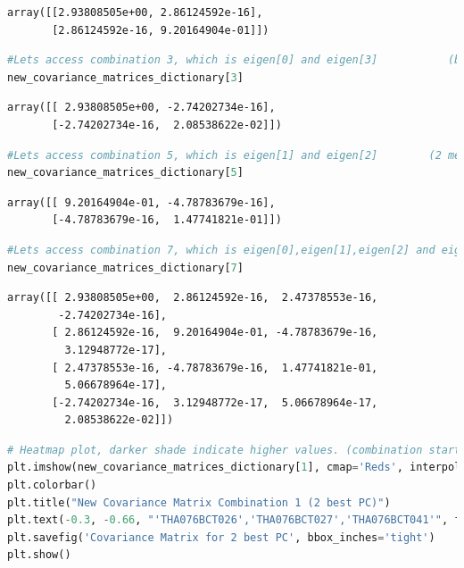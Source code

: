 \documentclass[
]{article}
\begin{document}
\begin{lstlisting}
array([[2.93808505e+00, 2.86124592e-16],
       [2.86124592e-16, 9.20164904e-01]])
\end{lstlisting}

\begin{lstlisting}[language=Python]
#Lets access combination 3, which is eigen[0] and eigen[3]           (best and worst component)
new_covariance_matrices_dictionary[3]
\end{lstlisting}

\begin{lstlisting}
array([[ 2.93808505e+00, -2.74202734e-16],
       [-2.74202734e-16,  2.08538622e-02]])
\end{lstlisting}

\begin{lstlisting}[language=Python]
#Lets access combination 5, which is eigen[1] and eigen[2]        (2 medium medium best components)
new_covariance_matrices_dictionary[5]
\end{lstlisting}

\begin{lstlisting}
array([[ 9.20164904e-01, -4.78783679e-16],
       [-4.78783679e-16,  1.47741821e-01]])
\end{lstlisting}

\begin{lstlisting}[language=Python]
#Lets access combination 7, which is eigen[0],eigen[1],eigen[2] and eigen[3]      (all components combined)
new_covariance_matrices_dictionary[7]
\end{lstlisting}

\begin{lstlisting}
array([[ 2.93808505e+00,  2.86124592e-16,  2.47378553e-16,
        -2.74202734e-16],
       [ 2.86124592e-16,  9.20164904e-01, -4.78783679e-16,
         3.12948772e-17],
       [ 2.47378553e-16, -4.78783679e-16,  1.47741821e-01,
         5.06678964e-17],
       [-2.74202734e-16,  3.12948772e-17,  5.06678964e-17,
         2.08538622e-02]])
\end{lstlisting}

\begin{lstlisting}[language=Python]
# Heatmap plot, darker shade indicate higher values. (combination starts from 0 to 7)
plt.imshow(new_covariance_matrices_dictionary[1], cmap='Reds', interpolation='nearest')  #for smoother interpolation of color on pixel values, instead of 'nearest', we can use 'bilinear','bicubic','spline16', 'spline36', 'hanning', 'hamming', 'hermite',etc..
plt.colorbar()
plt.title("New Covariance Matrix Combination 1 (2 best PC)")
plt.text(-0.3, -0.66, "'THA076BCT026','THA076BCT027','THA076BCT041'", fontsize=8,color='red')
plt.savefig('Covariance Matrix for 2 best PC', bbox_inches='tight')
plt.show()
\end{lstlisting}
\end{document}
